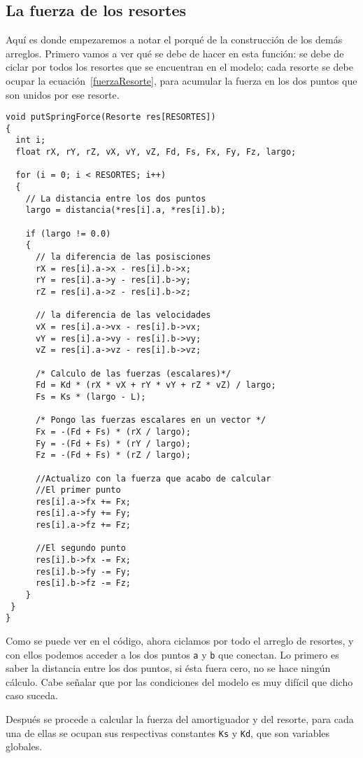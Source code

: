 \subsection{La fuerza de los resortes}
Aquí es donde empezaremos a notar el porqué de la construcción de los demás arreglos.
Primero vamos a ver qué se debe de hacer en esta función: se debe de ciclar por todos los resortes que se encuentran en el modelo; cada resorte se debe ocupar la ecuación~\ref{fuerzaResorte}, para acumular la fuerza en los dos puntos que son unidos por ese resorte.
\begin{verbatim}
void putSpringForce(Resorte res[RESORTES])
{
  int i;
  float rX, rY, rZ, vX, vY, vZ, Fd, Fs, Fx, Fy, Fz, largo;

  for (i = 0; i < RESORTES; i++)
  {
    // La distancia entre los dos puntos
    largo = distancia(*res[i].a, *res[i].b);

    if (largo != 0.0)
    {
      // la diferencia de las posisciones
      rX = res[i].a->x - res[i].b->x;
      rY = res[i].a->y - res[i].b->y;
      rZ = res[i].a->z - res[i].b->z;

      // la diferencia de las velocidades
      vX = res[i].a->vx - res[i].b->vx;
      vY = res[i].a->vy - res[i].b->vy;
      vZ = res[i].a->vz - res[i].b->vz;

      /* Calculo de las fuerzas (escalares)*/
      Fd = Kd * (rX * vX + rY * vY + rZ * vZ) / largo;
      Fs = Ks * (largo - L);

      /* Pongo las fuerzas escalares en un vector */
      Fx = -(Fd + Fs) * (rX / largo);
      Fy = -(Fd + Fs) * (rY / largo);
      Fz = -(Fd + Fs) * (rZ / largo);

      //Actualizo con la fuerza que acabo de calcular
      //El primer punto
      res[i].a->fx += Fx;
      res[i].a->fy += Fy;
      res[i].a->fz += Fz;

      //El segundo punto
      res[i].b->fx -= Fx;
      res[i].b->fy -= Fy;
      res[i].b->fz -= Fz;
    }
 }
}
\end{verbatim} 
Como se puede ver en el código, ahora ciclamos por todo el arreglo de resortes, y con ellos podemos acceder a los dos puntos \verb|a| y \verb|b| que conectan.
Lo primero es saber la distancia entre los dos puntos, si ésta fuera cero, no se hace ningún cálculo.
Cabe señalar que por las condiciones del modelo es muy difícil que dicho caso suceda.

Después se procede a calcular la fuerza del amortiguador y del resorte, para cada una de ellas se ocupan sus respectivas constantes \verb|Ks| y \verb|Kd|, que son variables globales.

